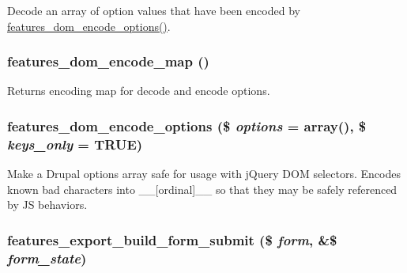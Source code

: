 \label{features_8admin_8inc_a345c3750b3d43f179d47f4346b4b24d4}
Decode an array of option values that have been encoded by \hyperlink{features_8admin_8inc_a023d4e66b2b73133fc99abf9e14a8f96}{features\_\-dom\_\-encode\_\-options()}. \hypertarget{features_8admin_8inc_af3d04e9b41e93d83767c38f0f5b8e0d5}{
\subsubsection[{features\_\-dom\_\-encode\_\-map}]{\setlength{\rightskip}{0pt plus 5cm}features\_\-dom\_\-encode\_\-map ()}}
\label{features_8admin_8inc_af3d04e9b41e93d83767c38f0f5b8e0d5}
Returns encoding map for decode and encode options. \hypertarget{features_8admin_8inc_a023d4e66b2b73133fc99abf9e14a8f96}{
\subsubsection[{features\_\-dom\_\-encode\_\-options}]{\setlength{\rightskip}{0pt plus 5cm}features\_\-dom\_\-encode\_\-options (\$ {\em options} = {\ttfamily array()}, \/  \$ {\em keys\_\-only} = {\ttfamily TRUE})}}
\label{features_8admin_8inc_a023d4e66b2b73133fc99abf9e14a8f96}
Make a Drupal options array safe for usage with jQuery DOM selectors. Encodes known bad characters into \_\-\_\-\mbox{[}ordinal\mbox{]}\_\-\_\- so that they may be safely referenced by JS behaviors. \hypertarget{features_8admin_8inc_afb232d8f40ae6b186567c6091ef0550e}{
\subsubsection[{features\_\-export\_\-build\_\-form\_\-submit}]{\setlength{\rightskip}{0pt plus 5cm}features\_\-export\_\-build\_\-form\_\-submit (\$ {\em form}, \/  \&\$ {\em form\_\-state})}}
\label{features_8admin_8inc_afb232d8f40ae6b186567c6091ef0550e}
